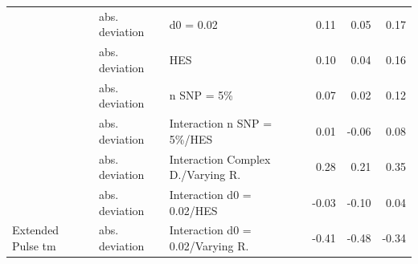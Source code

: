 \documentclass[11pt]{article}
\begin{document}
\begin{table}[H]
\begin{tabular}[t]{l|l|l|r|r|r}
 & abs. deviation & d0 = 0.02 & 0.11 & 0.05 & 0.17\\

 & abs. deviation & HES & 0.10 & 0.04 & 0.16\\

 & abs. deviation & n SNP = 5\% & 0.07 & 0.02 & 0.12\\

 & abs. deviation & Interaction n SNP = 5\%/HES & 0.01 & -0.06 & 0.08\\

 & abs. deviation & Interaction Complex D./Varying R. & 0.28 & 0.21 & 0.35\\

 & abs. deviation & Interaction d0 = 0.02/HES & -0.03 & -0.10 & 0.04\\

\multirow{-11}{*}{\raggedright\arraybackslash Extended Pulse tm} & abs. deviation & Interaction d0 = 0.02/Varying R. & -0.41 & -0.48 & -0.34\\
\hline
\end{tabular}
\end{table}
\end{document}
